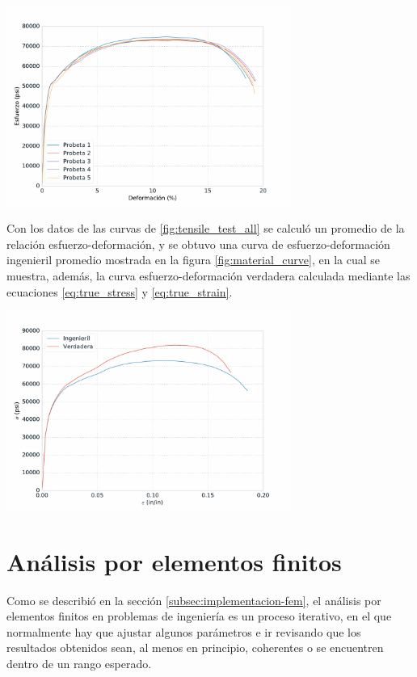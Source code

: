 \begin{center}
\includegraphics[width=0.7\textwidth]{src/ch3/tensile_test_all.pdf}
\label{fig:tensile_test_all}
\end{center}

Con los datos de las curvas de \ref{fig:tensile_test_all} se calculó un promedio de la relación esfuerzo-deformación, 
y se obtuvo una curva de esfuerzo-deformación ingenieril promedio mostrada en la figura \ref{fig:material_curve}, 
en la cual se muestra, además, la curva esfuerzo-deformación verdadera calculada mediante las ecuaciones 
\ref{eq:true_stress} y \ref{eq:true_strain}.

\begin{center}
\includegraphics[width=0.7\textwidth]{src/ch3/material_curve.pdf}
\label{fig:material_curve}
\end{center}

\section{Análisis por elementos finitos}

Como se describió en la sección \ref{subsec:implementacion-fem}, el análisis por elementos 
finitos en problemas de ingeniería es un proceso iterativo, en el que normalmente hay que ajustar 
algunos parámetros e ir revisando que los resultados obtenidos sean, al menos en principio, 
coherentes o se encuentren dentro de un rango esperado. \\

